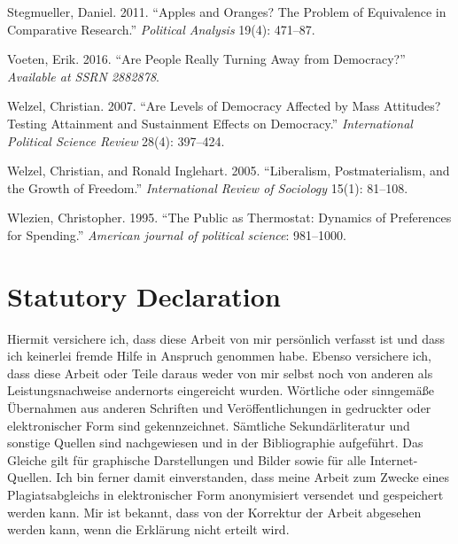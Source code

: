 \documentclass[12pt,english,a4paper,oneside]{article}
\newlength{\cslhangindent}
\newlength{\cslentryspacingunit} %
\newenvironment{CSLReferences}[2] %
 {%
  \setlength{\parindent}{0pt}
  \ifodd #1
  \let\oldpar\par
  \def\par{\hangindent=\cslhangindent\oldpar}
  \fi
  \setlength{\parskip}{#2\cslentryspacingunit}
 }%
 {}
\theoremstyle{definition}
\theoremstyle{definition}
\theoremstyle{definition}
\theoremstyle{definition}
\theoremstyle{remark}
\begin{document}
\begin{CSLReferences}{1}{0}
\leavevmode{}%
Stegmueller, Daniel. 2011. {``Apples and Oranges? The Problem of Equivalence in Comparative Research.''} \emph{Political Analysis} 19(4): 471--87.

\leavevmode{}%
Voeten, Erik. 2016. {``Are People Really Turning Away from Democracy?''} \emph{Available at SSRN 2882878}.

\leavevmode{}%
Welzel, Christian. 2007. {``Are Levels of Democracy Affected by Mass Attitudes? Testing Attainment and Sustainment Effects on Democracy.''} \emph{International Political Science Review} 28(4): 397--424.

\leavevmode{}%
Welzel, Christian, and Ronald Inglehart. 2005. {``Liberalism, Postmaterialism, and the Growth of Freedom.''} \emph{International Review of Sociology} 15(1): 81--108.

\leavevmode{}%
Wlezien, Christopher. 1995. {``The Public as Thermostat: Dynamics of Preferences for Spending.''} \emph{American journal of political science}: 981--1000.

\end{CSLReferences}

\clearpage

\hypertarget{statutory-declaration}{%
\section*{Statutory Declaration}\label{statutory-declaration}}

Hiermit versichere ich, dass diese Arbeit von mir persönlich verfasst ist und dass ich keinerlei fremde Hilfe in Anspruch genommen habe.
Ebenso versichere ich, dass diese Arbeit oder Teile daraus weder von mir selbst noch von anderen als Leistungsnachweise andernorts eingereicht wurden.
Wörtliche oder sinngemäße Übernahmen aus anderen Schriften und Veröffentlichungen in gedruckter oder elektronischer Form sind gekennzeichnet.
Sämtliche Sekundärliteratur und sonstige Quellen sind nachgewiesen und in der Bibliographie aufgeführt.
Das Gleiche gilt für graphische Darstellungen und Bilder sowie für alle Internet-Quellen.
Ich bin ferner damit einverstanden, dass meine Arbeit zum Zwecke eines Plagiatsabgleichs in elektronischer Form anonymisiert versendet und gespeichert werden kann.
Mir ist bekannt, dass von der Korrektur der Arbeit abgesehen werden kann, wenn die Erklärung nicht erteilt wird.
\end{document}
